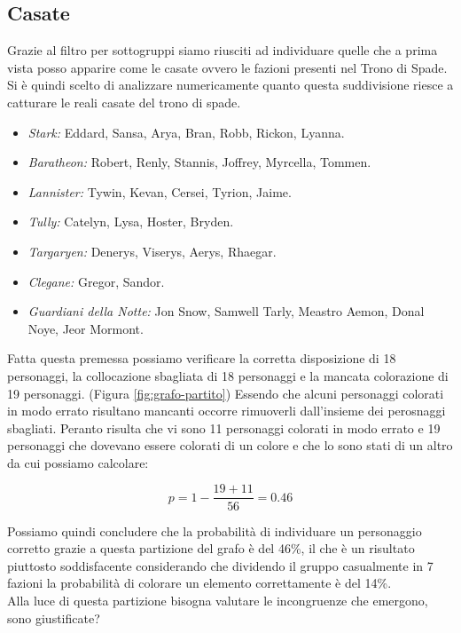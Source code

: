 \documentclass[a4paper]{article}
\begin{document}
\subsection{Casate}
Grazie al filtro per sottogruppi siamo riusciti ad individuare quelle che a prima vista posso apparire come le casate ovvero le fazioni presenti nel Trono di Spade.\\
Si è quindi scelto di analizzare numericamente quanto questa suddivisione riesce a catturare le reali casate del trono di spade.
\begin{itemize}
  \item \emph{Stark:} Eddard, Sansa, Arya, Bran, Robb, Rickon, Lyanna.
  \item \emph{Baratheon:} Robert, Renly, Stannis, Joffrey, Myrcella, Tommen.
  \item \emph{Lannister:} Tywin, Kevan, Cersei, Tyrion, Jaime.
  \item \emph{Tully:} Catelyn, Lysa, Hoster, Bryden.
  \item \emph{Targaryen:} Denerys, Viserys, Aerys, Rhaegar.
  \item \emph{Clegane:} Gregor, Sandor.
  \item \emph{Guardiani della Notte:} Jon Snow, Samwell Tarly, Meastro Aemon, Donal Noye, Jeor Mormont.
\end{itemize}

Fatta questa premessa possiamo verificare la corretta disposizione di 18 personaggi, la collocazione sbagliata di 18 personaggi e la mancata colorazione di 19 personaggi. (Figura \ref{fig:grafo-partito}) Essendo che alcuni personaggi colorati in modo errato risultano mancanti occorre rimuoverli dall'insieme dei perosnaggi sbagliati. Peranto risulta che vi sono 11 personaggi colorati in modo errato e 19 personaggi che dovevano essere colorati di un colore e che lo sono stati di un altro da cui possiamo calcolare:

\begin{equation}
	p=1-\frac{19+11}{56}=0.46    
\end{equation}

Possiamo quindi concludere che la probabilità di individuare un personaggio corretto grazie a questa partizione del grafo è del 46\%, il che è un risultato piuttosto soddisfacente considerando che dividendo il gruppo casualmente in 7 fazioni la probabilità di colorare un elemento correttamente è del 14\%.\\

Alla luce di questa partizione bisogna valutare le incongruenze che emergono, sono giustificate?
\end{document}
